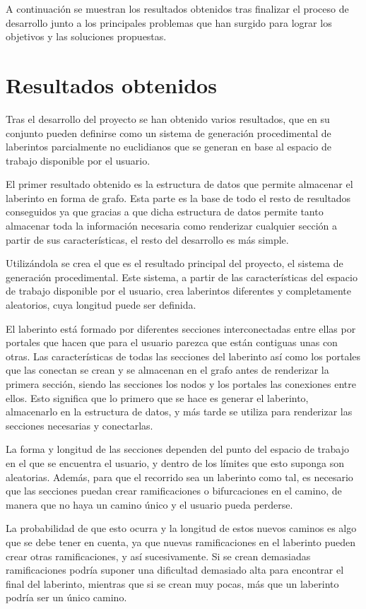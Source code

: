\documentclass[../main.tex]{subfiles}
\begin{document}
A continuación se muestran los resultados obtenidos tras finalizar el proceso de desarrollo junto a los principales problemas que han surgido para lograr los objetivos y las soluciones propuestas.

\section{Resultados obtenidos}

Tras el desarrollo del proyecto se han obtenido varios resultados, que en su conjunto pueden definirse como un sistema de generación procedimental de laberintos parcialmente no euclidianos que se generan en base al espacio de trabajo disponible por el usuario.

El primer resultado obtenido es la estructura de datos que permite almacenar el laberinto en forma de grafo. Esta parte es la base de todo el resto de resultados conseguidos ya que gracias a que dicha estructura de datos permite tanto almacenar toda la información necesaria como renderizar cualquier sección a partir de sus características, el resto del desarrollo es más simple.

Utilizándola se crea el que es el resultado principal del proyecto, el sistema de generación procedimental. Este sistema, a partir de las características del espacio de trabajo disponible por el usuario, crea laberintos diferentes y completamente aleatorios, cuya longitud puede ser definida. 

El laberinto está formado por diferentes secciones interconectadas entre ellas por portales que hacen que para el usuario parezca que están contiguas unas con otras. Las características de todas las secciones del laberinto así como los portales que las conectan se crean y se almacenan en el grafo antes de renderizar la primera sección, siendo las secciones los nodos y los portales las conexiones entre ellos. Esto significa que lo primero que se hace es generar el laberinto, almacenarlo en la estructura de datos, y más tarde se utiliza para renderizar las secciones necesarias y conectarlas. 

La forma y longitud de las secciones dependen del punto del espacio de trabajo en el que se encuentra el usuario, y dentro de los límites que esto suponga son aleatorias. Además, para que el recorrido sea un laberinto como tal, es necesario que las secciones puedan crear ramificaciones o bifurcaciones en el camino, de manera que no haya un camino único y el usuario pueda perderse. 

La probabilidad de que esto ocurra y la longitud de estos nuevos caminos es algo que se debe tener en cuenta, ya que nuevas ramificaciones en el laberinto pueden crear otras ramificaciones, y así sucesivamente. Si se crean demasiadas ramificaciones podría suponer una dificultad demasiado alta para encontrar el final del laberinto, mientras que si se crean muy pocas, más que un laberinto podría ser un único camino.
\end{document}
